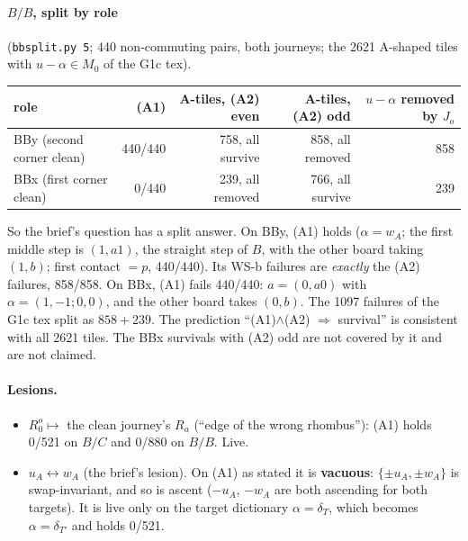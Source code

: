 \documentclass[11pt]{article}
\theoremstyle{definition}\newtheorem{definition}[theorem]{Definition}\newtheorem{remark}[theorem]{Remark}
\begin{document}
\paragraph{$B/B$, split by role} (\texttt{bbsplit.py 5}; 440 non-commuting pairs, both journeys; the 2621 A-shaped tiles with $u-\alpha\in M_0$ of the G1c tex).
\begin{center}\begin{tabular}{lrrrr}\toprule
role & (A1) & A-tiles, (A2) even & A-tiles, (A2) odd & $u-\alpha$ removed by $J_o$\\\midrule
BBy (second corner clean) & 440/440 & 758, all survive & 858, all removed & 858\\
BBx (first corner clean) & 0/440 & 239, all removed & 766, all survive & 239\\\bottomrule
\end{tabular}\end{center}
So the brief's question has a split answer. On BBy, (A1) holds ($\alpha=w_A$; the first middle step is $(1,a1)$, the straight step of $B$, with the other board taking $(1,b)$; first contact $=p$, 440/440). Its WS-b failures are \emph{exactly} the (A2) failures, 858/858.
On BBx, (A1) fails 440/440: $a=(0,a0)$ with $\alpha=(1,-1;0,0)$, and the other board takes $(0,b)$. The 1097 failures of the G1c tex split as $858+239$.
The prediction ``(A1)$\wedge$(A2) $\Rightarrow$ survival'' is consistent with all 2621 tiles. The BBx survivals with (A2) odd are not covered by it and are not claimed.
\paragraph{Lesions.}
\begin{itemize}
\item $R_0^o\mapsto$ the clean journey's $R_a$ (``edge of the wrong rhombus''): (A1) holds 0/521 on $B/C$ and 0/880 on $B/B$. Live.
\item $u_A\leftrightarrow w_A$ (the brief's lesion). On (A1) as stated it is \textbf{vacuous}: $\{\pm u_A,\pm w_A\}$ is swap-invariant, and so is ascent ($-u_A$, $-w_A$ are both ascending for both targets). It is live only on the target dictionary $\alpha=\delta_T$, which becomes $\alpha=\delta_{T'}$ and holds 0/521.
\end{itemize}
\end{document}
